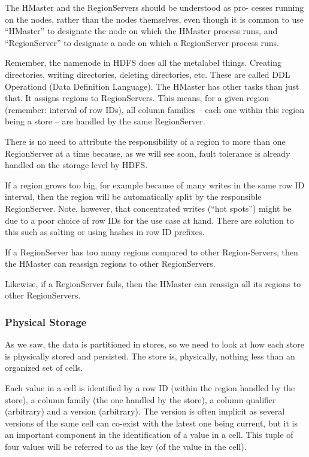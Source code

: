 The HMaster and the RegionServers should be understood as pro- cesses running on the nodes, rather than the nodes themselves, even though it is common to use “HMaster” to designate the node on which the HMaster process runs, and “RegionServer” to designate a node on which a RegionServer process runs.

Remember, the namenode in HDFS does all the metalabel things. Creating directories, writing directories, deleting directories, etc. These are called DDL Operationd (Data Definition Language). The HMaster has other tasks than just that. It assigns regions to RegionServers. This means, for a given region (remember: interval of row IDs), all column families – each one within this region being a store – are handled by the same RegionServer.

There is no need to attribute the responsibility of a region to more than one RegionServer at a time because, as we will see soon, fault tolerance is already handled on the storage level by HDFS.

If a region grows too big, for example because of many writes in the same row ID interval, then the region will be automatically split by the responsible RegionServer. Note, however, that concentrated writes (“hot spots”) might be due to a poor choice of row IDs for the use case at hand. There are solution to this such as salting or using hashes in row ID prefixes.

If a RegionServer has too many regions compared to other Region-Servers, then the HMaster can reassign regions to other RegionServers.

Likewise, if a RegionServer fails, then the HMaster can reassign all its regions to other RegionServers.


\subsubsection{Physical Storage}
As we saw, the data is partitioned in stores, so we need to look at how each store is physically stored and persisted. The store is, physically, nothing less than an organized set of cells.

Each value in a cell is identified by a row ID (within the region handled by the store), a column family (the one handled by the store), a column qualifier (arbitrary) and a version (arbitrary). The version is often implicit as several versions of the same cell can co-exist with the latest one being current, but it is an important component in the identification of a value in a cell. This tuple of four values will be referred to as the key (of the value in the cell).

